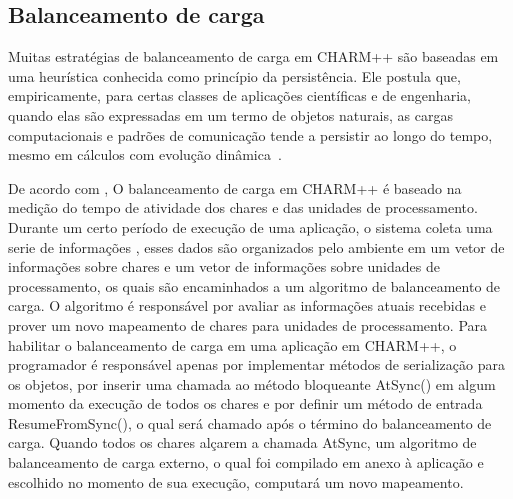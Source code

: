 \subsection{Balanceamento de carga}

Muitas estratégias de balanceamento de carga em CHARM++ são baseadas em uma heurística conhecida como princípio da persistência. Ele postula que, empiricamente, para certas classes de aplicações científicas e de engenharia, quando elas são expressadas em um termo de objetos naturais, as cargas computacionais e padrões de comunicação tende a persistir ao longo do tempo, mesmo em cálculos com evolução dinâmica~\cite{zheng2010hierarchical}.

De acordo com \cite{pilla2015programaccao2}, O balanceamento de carga em CHARM++ é baseado na medição do tempo de atividade dos chares e das unidades de processamento. Durante um certo período de execução de uma aplicação, o sistema coleta uma serie de informações , esses dados são organizados pelo ambiente em um vetor de informações sobre chares e um vetor de informações sobre unidades de processamento, os quais são encaminhados a um algoritmo de balanceamento de carga. O algoritmo é responsável por avaliar as informações atuais recebidas e prover um novo mapeamento de chares para unidades de processamento. Para habilitar o balanceamento de carga em uma aplicação em CHARM++, o programador é responsável apenas por implementar métodos de serialização para os objetos, por inserir uma chamada ao método bloqueante AtSync() em algum momento da execução de todos os chares e por definir um método de entrada ResumeFromSync(), o qual será chamado após o término do balanceamento de carga. Quando todos os chares alçarem a chamada AtSync, um algoritmo de balanceamento de carga externo, o qual foi compilado em anexo à aplicação e escolhido no momento de sua execução, computará um novo mapeamento.


 